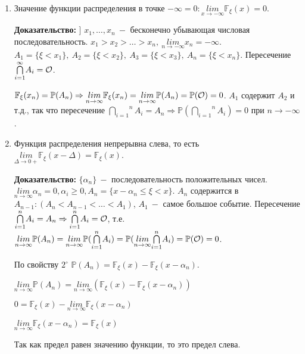 \documentclass[../Main.tex]{subfiles}
\begin{document}
\begin{enumerate}
    \item Значение функции распределения в точке \(-\infty=0 : \underset{{x \rightarrow -\infty}}{lim}{\mathbb{F}_\xi(x)=0}\).

    \textbf{Доказательство:} ] \(x_1, \dots, x_n \ -\) бесконечно убывающая числовая последовательность. \(x_1 > x_2 > \dots > x_n, \ \underset{n \rightarrow - \infty}{lim}x_n = - \infty\). \(A_1 = \{ \xi < x_1\},\ A_2 = \{ \xi < x_2\},\ A_3 = \{\xi < x_3\},\ A_n =\{ \xi < x_n \}\). Пересечение \(\overset{\infty}{\underset{i=1}{\bigcap}} A_i = \mathcal O\). 

    \(\mathbb{F}_\xi(x_n) = \mathbb{P}(A_n) \Rightarrow \underset{n \rightarrow \infty}{lim}\mathbb{F}_\xi (x_n) = \underset{n \rightarrow \infty}{lim}\mathbb{P}(A_n)=\mathbb{P}(\mathcal O)=0\). \(A_1\) содержит \(A_2\) и т.д., так что пересечение \(\overset{n}{\underset{i=1}{\bigcap}}A_i = A_n \Rightarrow \mathbb{P}(\overset{n}{\underset{i=1}{\bigcap}}A_i)=0\) при \(n \rightarrow -\infty\).
    
    \item Функция распределения непрерывна слева, то есть \(\underset{\Delta \rightarrow 0+}{lim}\mathbb{F}_\xi (x-\Delta) = \mathbb{F}_\xi (x)\).

    \textbf{Доказательство:} \(\{\alpha_n\}\ -\) последовательность положительных чисел. \(\underset{n \rightarrow \infty}{lim}\alpha_n = 0, \alpha_i \geq 0, A_n = \{ x-\alpha_n \leq \xi < x\}\). \(A_n\) содержится в \(A_{n-1}: (A_n < A_{n-1}< \dotsc < A_1)\), \(A_1 \ -\) самое большое событие. Пересечение \(\overset{n}{\underset{i=1}{\bigcap}}A_i = A_n \Rightarrow \overset{n}{\underset{i=1}{\bigcap}}A_i = \mathcal O\), т.е. \(\underset{n \rightarrow \infty}{lim} \mathbb{P}(A_n) = \underset{n \rightarrow \infty}{lim}\mathbb{P}(\overset{n}{\underset{i=1}{\bigcap}}A_i) = \mathbb{P}(\underset{n \rightarrow \infty}{lim}\overset{n}{\underset{i=1}{\bigcap}}A_i) = \mathbb{P}(\mathcal O) = 0\).

    По свойству \(2^\circ\) \(\mathbb{P}(A_n) = \mathbb{F}_\xi (x) - \mathbb{F}_\xi(x-\alpha_n)\).

    \(\underset{n \rightarrow \infty}{lim}\mathbb{P}(A_n) = \underset{n \rightarrow \infty}{lim}(\mathbb{F}_\xi (x) - \mathbb{F}_\xi(x-\alpha_n))\)

    \(0 = \mathbb{F}_\xi(x) - \underset{n \rightarrow \infty}{lim}\mathbb{F}_\xi(x - \alpha_n)\)

    \(\underset{n \rightarrow \infty}{lim} \mathbb{F}_\xi (x - \alpha_n) = \mathbb{F}_\xi (x)\)

    Так как предел равен значению функции, то это предел слева.
\end{enumerate}
\end{document}
